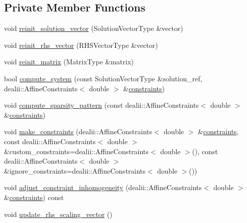 \subsection*{Private Member Functions}
\begin{DoxyCompactItemize}
\item 
void \hyperlink{classincremental_f_e_1_1_f_e_model_ae792df01f91eab7c12ecf41b7e8c514b}{reinit\+\_\+solution\+\_\+vector} (Solution\+Vector\+Type \&vector)
\item 
void \hyperlink{classincremental_f_e_1_1_f_e_model_aa8f0eaa319c21a88310d813fb34213f6}{reinit\+\_\+rhs\+\_\+vector} (R\+H\+S\+Vector\+Type \&vector)
\item 
void \hyperlink{classincremental_f_e_1_1_f_e_model_aca9a1d1eb2233b6dbfac86e14a092729}{reinit\+\_\+matrix} (Matrix\+Type \&matrix)
\item 
bool \hyperlink{classincremental_f_e_1_1_f_e_model_a9ac2dbc4fdd4630cce4961a2360dc0f6}{compute\+\_\+system} (const Solution\+Vector\+Type \&solution\+\_\+ref, dealii\+::\+Affine\+Constraints$<$ double $>$ \&\hyperlink{classincremental_f_e_1_1_f_e_model_a33a622c3c53ea4bee3bdefac06201c70}{constraints})
\item 
void \hyperlink{classincremental_f_e_1_1_f_e_model_a7c5c84e081ebe20e373ec5d2abc359b7}{compute\+\_\+sparsity\+\_\+pattern} (const dealii\+::\+Affine\+Constraints$<$ double $>$ \&\hyperlink{classincremental_f_e_1_1_f_e_model_a33a622c3c53ea4bee3bdefac06201c70}{constraints})
\item 
void \hyperlink{classincremental_f_e_1_1_f_e_model_ae96fd0a7b6688ed844059d2636e923cc}{make\+\_\+constraints} (dealii\+::\+Affine\+Constraints$<$ double $>$ \&\hyperlink{classincremental_f_e_1_1_f_e_model_a33a622c3c53ea4bee3bdefac06201c70}{constraints}, const dealii\+::\+Affine\+Constraints$<$ double $>$ \&custom\+\_\+constraints=dealii\+::\+Affine\+Constraints$<$ double $>$(), const dealii\+::\+Affine\+Constraints$<$ double $>$ \&ignore\+\_\+constraints=dealii\+::\+Affine\+Constraints$<$ double $>$())
\item 
void \hyperlink{classincremental_f_e_1_1_f_e_model_a08717e3296b8b304ebaed4a67638dae3}{adjust\+\_\+constraint\+\_\+inhomogeneity} (dealii\+::\+Affine\+Constraints$<$ double $>$ \&\hyperlink{classincremental_f_e_1_1_f_e_model_a33a622c3c53ea4bee3bdefac06201c70}{constraints}) const 
\item 
void \hyperlink{classincremental_f_e_1_1_f_e_model_a42ff8db18960919cc440d0053e4d5891}{update\+\_\+rhs\+\_\+scaling\+\_\+vector} ()
\item 

\end{DoxyCompactItemize}

